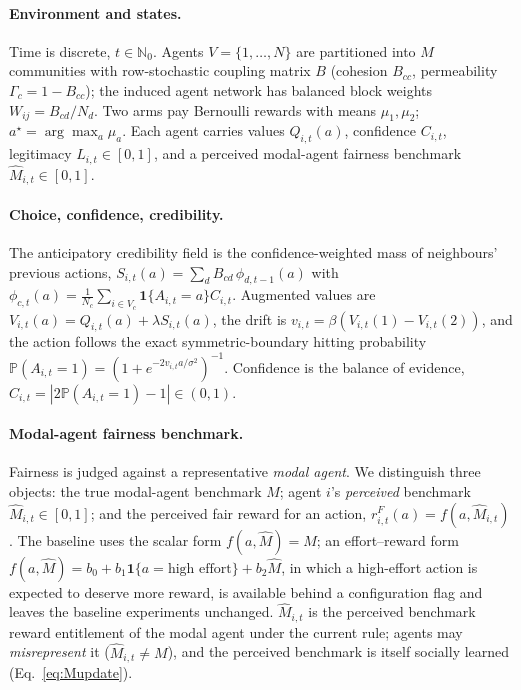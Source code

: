 \documentclass[11pt]{article}
\newcommand{\Prob}{\mathbb{P}}
\newcommand{\1}{\mathbf{1}}
\begin{document}
\paragraph{Environment and states.}
Time is discrete, $t\in\mathbb N_0$. Agents $V=\{1,\dots,N\}$ are partitioned into
$M$ communities with row-stochastic coupling matrix $B$ (cohesion $B_{cc}$,
permeability $\Gamma_c=1-B_{cc}$); the induced agent network has balanced block
weights $W_{ij}=B_{cd}/N_d$. Two arms pay Bernoulli rewards with means
$\mu_1,\mu_2$; $a^\star=\arg\max_a\mu_a$. Each agent carries values $Q_{i,t}(a)$,
confidence $C_{i,t}$, legitimacy $L_{i,t}\in[0,1]$, and a perceived modal-agent
fairness benchmark $\hat M_{i,t}\in[0,1]$.

\paragraph{Choice, confidence, credibility.}
The anticipatory credibility field is the confidence-weighted mass of neighbours'
previous actions, $S_{i,t}(a)=\sum_{d}B_{cd}\,\phi_{d,t-1}(a)$ with
$\phi_{c,t}(a)=\frac1{N_c}\sum_{i\in V_c}\1\{A_{i,t}=a\}C_{i,t}$. Augmented values
are $V_{i,t}(a)=Q_{i,t}(a)+\lambda S_{i,t}(a)$, the drift is
$v_{i,t}=\beta(V_{i,t}(1)-V_{i,t}(2))$, and the action follows the exact
symmetric-boundary hitting probability
$\Prob(A_{i,t}=1)=(1+e^{-2v_{i,t}a/\sigma^2})^{-1}$. Confidence is the balance of
evidence, $C_{i,t}=|2\Prob(A_{i,t}=1)-1|\in(0,1)$.

\paragraph{Modal-agent fairness benchmark.}
Fairness is judged against a representative \emph{modal agent}. We distinguish
three objects: the true modal-agent benchmark $M$; agent $i$'s \emph{perceived}
benchmark $\hat M_{i,t}\in[0,1]$; and the perceived fair reward for an action,
$r^F_{i,t}(a)=f(a,\hat M_{i,t})$. The baseline uses the scalar form
$f(a,\hat M)=\hat M$; an effort--reward form
$f(a,\hat M)=b_0+b_1\1\{a=\text{high effort}\}+b_2\hat M$, in which a high-effort
action is expected to deserve more reward, is available behind a configuration
flag and leaves the baseline experiments unchanged. $\hat M_{i,t}$ is the
perceived benchmark reward entitlement of the modal agent under the current rule;
agents may \emph{misrepresent} it ($\hat M_{i,t}\neq M$), and the perceived
benchmark is itself socially learned (Eq.~\ref{eq:Mupdate}).
\end{document}
